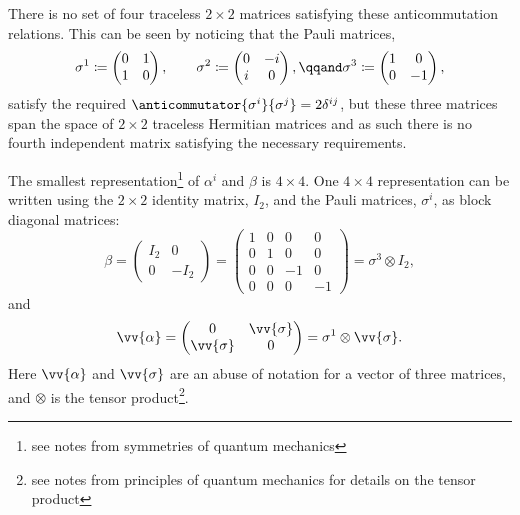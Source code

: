 \documentclass[fleqn]{NotesClass}
\newcommand{\ident}{I}
\begin{document}
    There is no set of four traceless \(2\times 2\) matrices satisfying these anticommutation relations.
    This can be seen by noticing that the Pauli matrices,
    \begin{equation}
        \sigma^1 \coloneqq 
        \begin{pmatrix}
            0 & 1\\ 1 & 0
        \end{pmatrix}
        , \qquad \sigma^2 \coloneqq
        \begin{pmatrix}
            0 & -i\\ i & 0
        \end{pmatrix}
        , \qqand \sigma^3 \coloneqq 
        \begin{pmatrix}
            1 & 0\\ 0 & -1
        \end{pmatrix}
        ,
    \end{equation}
    satisfy the required \(\anticommutator{\sigma^i}{\sigma^j} = 2\delta^{ij}\), but these three matrices span the space of \(2\times 2\) traceless Hermitian matrices and as such there is no fourth independent matrix satisfying the necessary requirements.
     
    The smallest representation\footnote{see notes from symmetries of quantum mechanics} of \(\alpha^i\) and \(\beta\) is \(4\times 4\).
    One \(4\times 4\) representation can be written using the \(2\times 2\) identity matrix, \(\ident_2\), and the Pauli matrices, \(\sigma^i\), as block diagonal matrices:
    \begin{equation}
        \beta = 
        \begin{pmatrix}
            \ident_2 & 0\\
            0 & -\ident_2
        \end{pmatrix}
        =
        \begin{pmatrix}
            1 & 0 & 0 & 0\\
            0 & 1 & 0 & 0\\
            0 & 0 & -1 & 0\\
            0 & 0 & 0 & -1
        \end{pmatrix}
        = \sigma^3 \otimes \ident_2,
    \end{equation}
    and
    \begin{equation}
        \vv{\alpha} = 
        \begin{pmatrix}
            0 & \vv{\sigma}\\
            \vv{\sigma} & 0
        \end{pmatrix}
        = \sigma^1 \otimes \vv{\sigma}.
    \end{equation}
    Here \(\vv{\alpha}\) and \(\vv{\sigma}\) are an abuse of notation for a vector of three matrices, and \(\otimes\) is the tensor product\footnote{see notes from principles of quantum mechanics for details on the tensor product}.
    
\end{document}
